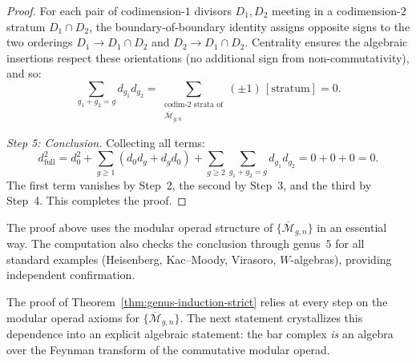 \begin{proof}
For each pair of codimension-$1$ divisors $D_1, D_2$ meeting in a codimension-$2$
stratum $D_1 \cap D_2$, the boundary-of-boundary identity assigns opposite signs
to the two orderings $D_1 \to D_1 \cap D_2$ and $D_2 \to D_1 \cap D_2$.
Centrality ensures the algebraic insertions respect these orientations (no
additional sign from non-commutativity), and so:
\[
 \sum_{g_1 + g_2 = g} d_{g_1} d_{g_2}
 = \sum_{\substack{\text{codim-2 strata of}\\
 \overline{\mathcal{M}}_{g,n}}} (\pm 1)\, [\text{stratum}] = 0.
\]

\medskip
\emph{Step 5: Conclusion.}
Collecting all terms:
\[
 d_{\mathrm{full}}^2 = d_0^2
 + \sum_{g \geq 1} (d_0 d_g + d_g d_0)
 + \sum_{g \geq 2}\sum_{g_1 + g_2 = g} d_{g_1} d_{g_2}
 = 0 + 0 + 0 = 0.
\]
The first term vanishes by Step~2, the second by Step~3, and the third by Step~4.
This completes the proof.
\end{proof}

\begin{remark}\label{rem:genus-induction-computational-check}
The proof above uses the modular operad structure of
$\{\overline{\mathcal{M}}_{g,n}\}$ in an essential way. The computation
also checks the conclusion through genus~$5$ for all standard examples
(Heisenberg, Kac--Moody, Virasoro, $W$-algebras), providing independent
confirmation.
\end{remark}

The proof of Theorem~\ref{thm:genus-induction-strict} relies at every step on
the modular operad axioms for $\{\overline{\mathcal{M}}_{g,n}\}$. The next
statement crystallizes this dependence into an explicit algebraic statement: the bar
complex \emph{is} an algebra over the Feynman transform of the commutative
modular operad.

